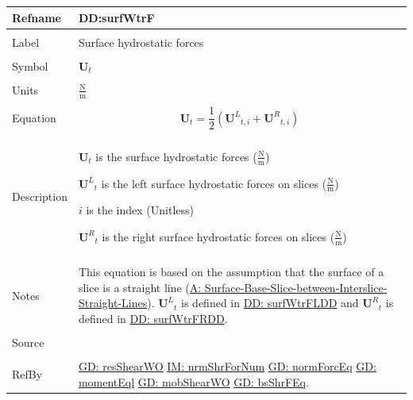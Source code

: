 \documentclass[12pt]{article}
\begin{document}
\noindent \begin{minipage}{\textwidth}
\begin{tabular}{p{} p{}}
\toprule \textbf{Refname} & \textbf{DD:surfWtrF}
\label{DD:surfWtrF}
\\ \midrule \\
Label & Surface hydrostatic forces
\\ \midrule \\
Symbol & ${\mathbf{U}_{t}}$
\\ \midrule \\
Units & $\frac{\text{N}}{\text{m}}$
\\ \midrule \\
Equation & \begin{displaymath}
           {\mathbf{U}_{t}}=\frac{1}{2} \left({{\mathbf{U}^{L}}_{t,i}}+{{\mathbf{U}^{R}}_{t,i}}\right)
           \end{displaymath}
\\ \midrule \\
Description & \begin{symbDescription}
              \item{${\mathbf{U}_{t}}$ is the surface hydrostatic forces ($\frac{\text{N}}{\text{m}}$)}
              \item{${{\mathbf{U}^{L}}_{t}}$ is the left surface hydrostatic forces on slices ($\frac{\text{N}}{\text{m}}$)}
              \item{$i$ is the index (Unitless)}
              \item{${{\mathbf{U}^{R}}_{t}}$ is the right surface hydrostatic forces on slices ($\frac{\text{N}}{\text{m}}$)}
              \end{symbDescription}
\\ \midrule \\
Notes & This equation is based on the assumption that the surface of a slice is a straight line (\hyperref[assumpSBSBISL]{A: Surface-Base-Slice-between-Interslice-Straight-Lines}). ${{\mathbf{U}^{L}}_{t}}$ is defined in \hyperref[DD:surfWtrFLDD]{DD: surfWtrFLDD} and ${{\mathbf{U}^{R}}_{t}}$ is defined in \hyperref[DD:surfWtrFRDD]{DD: surfWtrFRDD}.
\\ \midrule \\
Source & \cite{fredlund1977}
\\ \midrule \\
RefBy & \hyperref[GD:resShearWO]{GD: resShearWO} \hyperref[IM:nrmShrForNum]{IM: nrmShrForNum} \hyperref[GD:normForcEq]{GD: normForcEq} \hyperref[GD:momentEql]{GD: momentEql} \hyperref[GD:mobShearWO]{GD: mobShearWO} \hyperref[GD:bsShrFEq]{GD: bsShrFEq}.
\\ \bottomrule \end{tabular}
\end{minipage}
\par~
\end{document}
